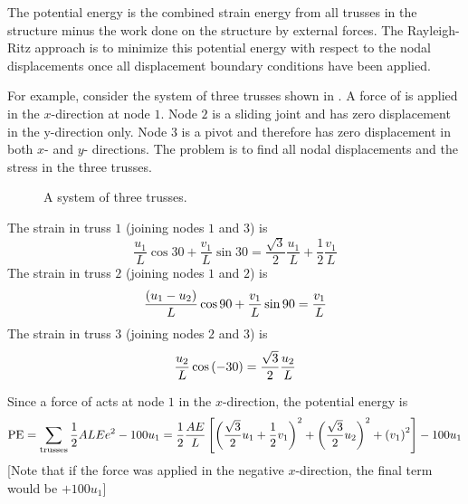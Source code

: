 The potential energy is the combined strain energy from all trusses in the
structure minus the work done on the structure by external forces. The
Rayleigh-Ritz  approach is to minimize this
potential energy with respect to the nodal displacements once all displacement
boundary conditions have been applied.

For example, consider the system of three trusses shown in
. A force of  is applied in the $x$-direction 
at node $1$.  Node $2$ is a sliding joint and has zero displacement in the
y-direction only.  Node $3$ is a pivot and therefore has zero displacement in
both $x$- and $y$- directions. The problem is to find all nodal displacements and
the stress in the three trusses.

\begin{figure}[htbp] \centering
  
  \caption{A system of three trusses.}
  \label{fig:system}
\end{figure}

The strain in truss $1$ (joining nodes $1$ and $3$) is 
\begin{displaymath}
  \dfrac{u_{1}}{L}\cos 30+\dfrac{v_{1}}{L} \sin 30=
  \dfrac{\sqrt{3}}{2}\dfrac{u_{1}}{L}+\dfrac{1}{2}\dfrac{v_{1}}{L}
\end{displaymath}
The strain in truss $2$ (joining nodes $1$ and $2$) is 
\begin{displaymath}
  \dfrac{\left( u_{1}-u_{2} \right)}{L}\cos 90+\dfrac{v_{1}}{L}\sin 90=\dfrac{v_{1}}{L}
\end{displaymath}
The strain in truss $3$ (joining nodes $2$ and $3$) is 
\begin{displaymath}
  \frac{u_{2}}{L}\cos \left( -30 \right)=\dfrac{\sqrt{3}}{2}\dfrac{u_{2}}{L}
\end{displaymath} 

Since a force of  acts at node $1$ in the $x$-direction, 
the potential energy is
\begin{displaymath}  
  \text{PE} =\sum_{\text{trusses}} \dfrac{1}{2} ALEe^{2} - 100 u_{1} =
  \dfrac{1}{2}\frac{AE}{L} \left[ \left( \dfrac{\sqrt{3}}{2} u_{1} +
      \dfrac{1}{2} v_{1} \right)^{2}+\left( \dfrac{\sqrt{3}}{2} u_{2} \right)^2 +
      \left( v_{1} \right)^{2} \right]- 100u_{1}
\end{displaymath}
[Note that if the force was applied in the negative $x$-direction, the final
  term would be $+ 100 u_{1}$]

